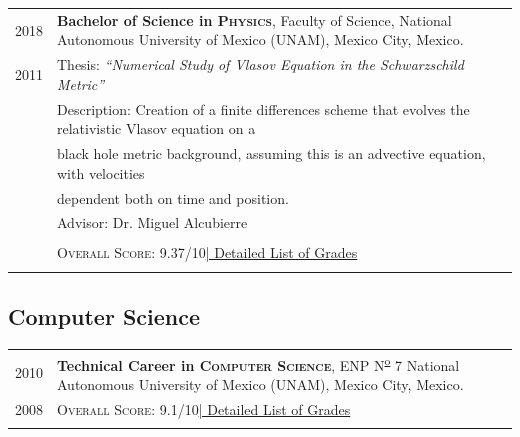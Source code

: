 \documentclass[a4paper,10pt]{article} %
\begin{document}
\begin{tabular}{r|p{14.5cm}}	
	
	
	\textsc{2018} & \textbf{Bachelor of Science in \textsc{\large{Physics}}}, Faculty of Science, National Autonomous University of Mexico (UNAM), \small Mexico City, Mexico.\\
	\textsc{2011} & Thesis: \emph{``Numerical Study of Vlasov Equation in the Schwarzschild Metric''}\\
	&\small Description: Creation of a finite differences scheme that evolves the relativistic Vlasov equation on a\\
	&\hspace{1.7cm} \small black hole metric background, assuming this is an advective equation, with velocities \\
	&\hspace{1.7cm} \small dependent both on time and position.\\
	& \small Advisor: Dr. Miguel Alcubierre\\
	& \\
	&\normalsize \textsc{Overall Score}: 9.37/10\hyperlink{grdsbach}{\hfill | \footnotesize Detailed List of Grades}\\
	\multicolumn{2}{c}{}\\
	
	
\end{tabular}	

\subsection*{Computer Science}

\begin{tabular}{r|p{14cm}}
	\textsc{2010} & \textbf{Technical Career in \textsc{\large{Computer Science}}}, ENP N\textsuperscript{\underline{o}} 7 National Autonomous University of Mexico (UNAM), \small Mexico City, Mexico.\\
	\textsc{2008}& \normalsize \textsc{Overall Score}: 9.1/10\hyperlink{grdstechcarr}{\hfill | \footnotesize Detailed List of Grades}\\
	\multicolumn{2}{c}{}\\
	
\end{tabular}
\end{document}
